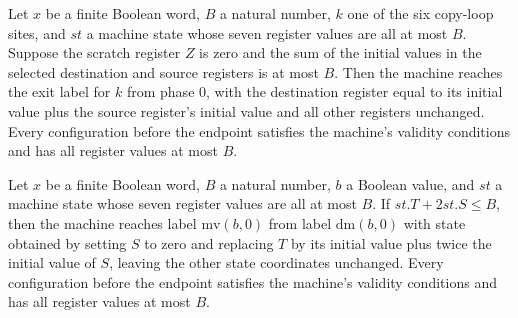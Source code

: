 \begin{theorem}
\label{Complexity.LogProg.TQBFARM.cp_run}
\leanok
{}
Let $x$ be a finite Boolean word, $B$ a natural number, $k$ one of the six copy-loop
sites, and $st$ a machine state whose seven register values are all at most $B$. Suppose
the scratch register $Z$ is zero and the sum of the initial values in the selected
destination and source registers is at most $B$. Then the machine reaches the exit label
for $k$ from phase $0$, with the destination register equal to its initial value plus
the source register's initial value and all other registers unchanged. Every
configuration before the endpoint satisfies the machine's validity conditions and has
all register values at most $B$.
\end{theorem}

\begin{theorem}
\label{Complexity.LogProg.TQBFARM.dm_run}
\leanok
{}
Let $x$ be a finite Boolean word, $B$ a natural number, $b$ a Boolean value, and $st$ a
machine state whose seven register values are all at most $B$. If $st.T+2st.S\le B$,
then the machine reaches label $\mathrm{mv}(b,0)$ from label $\mathrm{dm}(b,0)$ with
state obtained by setting $S$ to zero and replacing $T$ by its initial value plus twice
the initial value of $S$, leaving the other state coordinates unchanged. Every
configuration before the endpoint satisfies the machine's validity conditions and has
all register values at most $B$.
\end{theorem}

